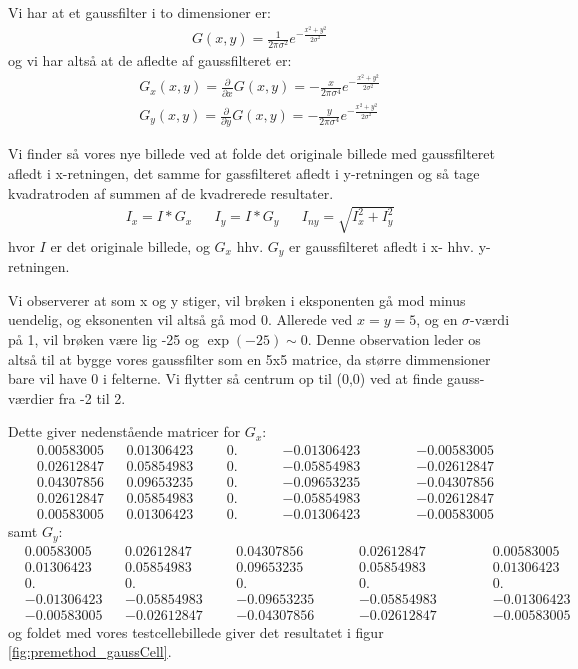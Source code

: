 Vi har at et gaussfilter i to dimensioner er:
\begin{align}
	G(x,y) = \frac{1}{2\pi\sigma^2}e^{-\frac{x^2+y^2}{2\sigma^2}}
\end{align}
og vi har altså at de afledte af gaussfilteret er:
\begin{align}
	G_x(x,y) = \frac{\partial}{\partial x}G(x,y)=-\frac{x}{2\pi\sigma^4}e^{-\frac{x^2+y^2}{2\sigma^2}} \\
	G_y(x,y) = \frac{\partial}{\partial y}G(x,y)=-\frac{y}{2\pi\sigma^4}e^{-\frac{x^2+y^2}{2\sigma^2}}
\end{align}

Vi finder så vores nye billede ved at folde det originale billede med gaussfilteret afledt i x-retningen, det samme for gassfilteret afledt i y-retningen og så tage kvadratroden af summen af de kvadrerede resultater.
\begin{align}
	I_x = I * G_x && I_y = I * G_y && I_{ny} = \sqrt{I_x^2+I_y^2}
\end{align} 
hvor $I$ er det originale billede, og $G_x$ hhv. $G_y$ er gaussfilteret afledt i x- hhv. y-retningen.

Vi observerer at som x og y stiger, vil brøken i eksponenten gå mod minus uendelig, og eksonenten vil altså gå mod 0. Allerede ved $x=y=5$, og en $\sigma$-værdi på 1, vil brøken være lig -25 og $\exp(-25)\sim0$. Denne observation leder os altså til at bygge vores gaussfilter som en 5x5 matrice, da større dimmensioner bare vil have 0 i felterne. Vi flytter så centrum op til (0,0) ved at finde gauss-værdier fra -2 til 2.

Dette giver nedenstående matricer for $G_x$:
\begin{align*}
 &0.00583005  &&0.01306423  &&&0. 			&&&&-0.01306423 &&&&&-0.00583005\\
 &0.02612847  &&0.05854983  &&&0. 			&&&&-0.05854983 &&&&&-0.02612847\\
 &0.04307856  &&0.09653235  &&&0. 			&&&&-0.09653235 &&&&&-0.04307856\\
 &0.02612847  &&0.05854983  &&&0. 			&&&&-0.05854983 &&&&&-0.02612847\\
 &0.00583005  &&0.01306423  &&&0. 			&&&&-0.01306423 &&&&&-0.00583005
\end{align*}
samt $G_y$:
\begin{align*}
	&0.00583005  &&0.02612847  &&&0.04307856  	&&&&0.02612847  &&&&&0.00583005\\
	&0.01306423  &&0.05854983  &&&0.09653235  	&&&&0.05854983  &&&&&0.01306423\\
	&0.          &&0.          &&&0.          	&&&&0.          &&&&&0.        \\
	&-0.01306423 &&-0.05854983 &&&-0.09653235 	&&&&-0.05854983 &&&&&-0.01306423\\
	&-0.00583005 &&-0.02612847 &&&-0.04307856 	&&&&-0.02612847 &&&&&-0.00583005
\end{align*}
og foldet med vores testcellebillede giver det resultatet i figur \ref{fig:premethod_gaussCell}.

